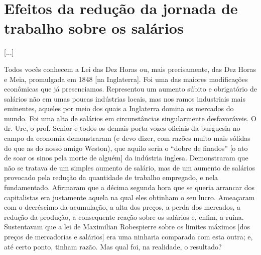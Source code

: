 \section*{Efeitos da redução da jornada de trabalho sobre os salários}

[...]

 Todos vocês conhecem a Lei das Dez Horas ou, mais precisamente, das Dez Horas e Meia, promulgada em 1848 [na Inglaterra]. Foi uma das maiores modificações econômicas que já presenciamos. Representou um aumento súbito e obrigatório de salários não em umas poucas indústrias locais, mas nos ramos industriais mais eminentes, aqueles por meio dos quais a Inglaterra domina os mercados do mundo. Foi uma alta de salários em circunstâncias singularmente desfavoráveis. O dr. Ure, o prof. Senior e todos os demais porta-vozes oficiais da burguesia no campo da economia demonstraram (e devo dizer, com razões muito mais sólidas do que as do nosso amigo Weston), que aquilo seria o “dobre de finados” [o ato de soar os sinos pela morte de alguém] da indústria inglesa. Demonstraram que não se tratava de um simples aumento de salário, mas de um aumento de salários provocado pela redução da quantidade de trabalho empregado, e nela fundamentado. Afirmaram que a décima segunda hora que se queria arrancar dos capitalistas era justamente aquela na qual eles obtinham o seu lucro. Ameaçaram com o decréscimo da acumulação, a alta dos preços, a perda dos mercados, a redução da produção, a consequente reação sobre os salários e, enfim, a ruína. Sustentavam que a lei de Maximilian Robespierre sobre os limites máximos [dos preços de mercadorias e salários] era uma ninharia comparada com esta outra; e, até certo ponto, tinham razão. Mas qual foi, na realidade, o resultado?

